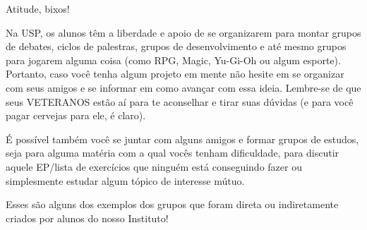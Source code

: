\begin{secao}{Atitude, bixos!}

Na USP, os alunos têm a liberdade e apoio de se organizarem
para montar grupos de debates, ciclos de palestras, grupos
de desenvolvimento e até mesmo grupos para jogarem alguma coisa (como
RPG, Magic, Yu-Gi-Oh ou algum esporte).
Portanto, caso você tenha algum projeto em mente não hesite
em se organizar com seus amigos e se informar em como avançar com essa ideia.
Lembre-se de que seus VETERANOS estão aí para te aconselhar e tirar suas
dúvidas (e para você pagar cervejas para ele, é claro).

É possível também você se juntar com alguns amigos e formar grupos de
estudos, seja para alguma matéria com a qual vocês tenham dificuldade, para
discutir aquele EP/lista de exercícios que ninguém está conseguindo
fazer ou simplesmente estudar algum tópico de interesse mútuo.

Esses são alguns dos exemplos dos grupos que foram direta ou indiretamente
criados por alunos do nosso Instituto!













\end{secao}
